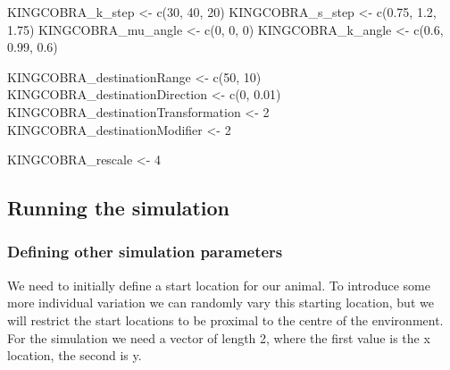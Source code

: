 \documentclass[10pt,a4paper]{article}
\newenvironment{Shaded}{}{}
\newcommand{\DecValTok}[1]{#1}
\newcommand{\FloatTok}[1]{#1}
\newcommand{\FunctionTok}[1]{#1}
\newcommand{\NormalTok}[1]{#1}
\newcommand{\OtherTok}[1]{#1}
\begin{document}
\begin{Shaded}
\begin{Highlighting}[]
\NormalTok{KINGCOBRA\_k\_step }\OtherTok{\textless{}{-}} \FunctionTok{c}\NormalTok{(}\DecValTok{30}\NormalTok{, }\DecValTok{40}\NormalTok{, }\DecValTok{20}\NormalTok{)}
\NormalTok{KINGCOBRA\_s\_step }\OtherTok{\textless{}{-}} \FunctionTok{c}\NormalTok{(}\FloatTok{0.75}\NormalTok{, }\FloatTok{1.2}\NormalTok{, }\FloatTok{1.75}\NormalTok{)}
\NormalTok{KINGCOBRA\_mu\_angle }\OtherTok{\textless{}{-}} \FunctionTok{c}\NormalTok{(}\DecValTok{0}\NormalTok{, }\DecValTok{0}\NormalTok{, }\DecValTok{0}\NormalTok{)}
\NormalTok{KINGCOBRA\_k\_angle }\OtherTok{\textless{}{-}} \FunctionTok{c}\NormalTok{(}\FloatTok{0.6}\NormalTok{, }\FloatTok{0.99}\NormalTok{, }\FloatTok{0.6}\NormalTok{)}

\NormalTok{KINGCOBRA\_destinationRange }\OtherTok{\textless{}{-}} \FunctionTok{c}\NormalTok{(}\DecValTok{50}\NormalTok{, }\DecValTok{10}\NormalTok{)}
\NormalTok{KINGCOBRA\_destinationDirection }\OtherTok{\textless{}{-}} \FunctionTok{c}\NormalTok{(}\DecValTok{0}\NormalTok{, }\FloatTok{0.01}\NormalTok{)}
\NormalTok{KINGCOBRA\_destinationTransformation }\OtherTok{\textless{}{-}} \DecValTok{2}
\NormalTok{KINGCOBRA\_destinationModifier }\OtherTok{\textless{}{-}} \DecValTok{2}

\NormalTok{KINGCOBRA\_rescale }\OtherTok{\textless{}{-}} \DecValTok{4}
\end{Highlighting}
\end{Shaded}

\hypertarget{running-the-simulation}{%
\subsection{Running the simulation}\label{running-the-simulation}}

\hypertarget{defining-other-simulation-parameters}{%
\subsubsection{Defining other simulation parameters}\label{defining-other-simulation-parameters}}

We need to initially define a start location for our animal.
To introduce some more individual variation we can randomly vary this starting location, but we will restrict the start locations to be proximal to the centre of the environment.
For the simulation we need a vector of length 2, where the first value is the x location, the second is y.
\end{document}
